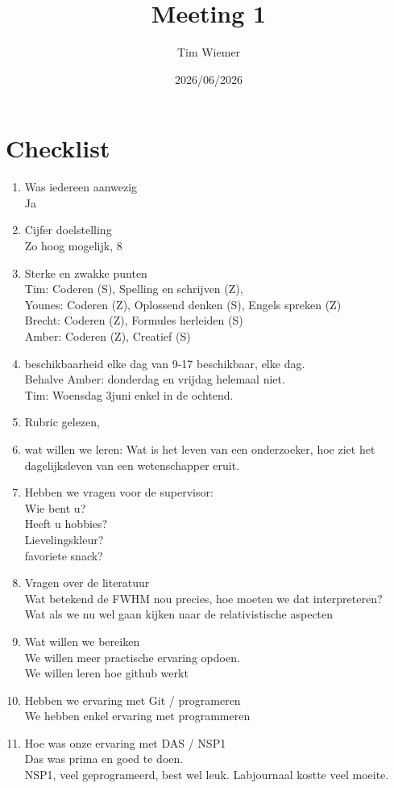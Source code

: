 \documentclass{article}
\title{Meeting 1}
\author{Tim Wiemer}
\date{2026/06/2026}
\begin{document}
\maketitle

\section{Checklist}

\begin{enumerate}
    \item{Was iedereen aanwezig} \\ Ja
    \item{Cijfer doelstelling} \\ Zo hoog mogelijk, 8
    \item{Sterke en zwakke punten}\\
    Tim: Coderen (S), Spelling en schrijven (Z),  \\
    Younes: Coderen (Z), Oplossend denken (S), Engels spreken (Z) \\ 
    Brecht: Coderen (Z), Formules herleiden (S)\\ 
    Amber: Coderen (Z), Creatief (S)\\
    \item{beschikbaarheid} elke dag van 9-17 beschikbaar, elke dag.\\
        Behalve Amber: donderdag en vrijdag helemaal niet.\\
        Tim: Woensdag 3juni enkel in de ochtend.
    \item{Rubric gelezen}, 
    \item{wat willen we leren}: 
        Wat is het leven van een onderzoeker, hoe ziet het dagelijksleven van een wetenschapper eruit. 
    \item{ Hebben we vragen voor de supervisor}:\\
        Wie bent u? \\
        Heeft u hobbies? \\
        Lievelingskleur? \\
        favoriete snack? \\
    \item{Vragen over de literatuur}\\
        Wat betekend de FWHM nou precies, hoe moeten we dat interpreteren?\\
        Wat als we nu wel gaan kijken naar de relativistische aspecten\\
    \item{Wat willen we bereiken}\\
        We willen meer practische ervaring opdoen. \\
        We willen leren hoe github werkt
    \item{Hebben we ervaring met Git / programeren}\\
        We hebben enkel ervaring met programmeren
    \item{Hoe was onze ervaring met DAS / NSP1}\\
        Das was prima en goed te doen. \\
        NSP1, veel geprogrameerd, best wel leuk. Labjournaal kostte veel moeite.
\end{enumerate}
\end{document}
